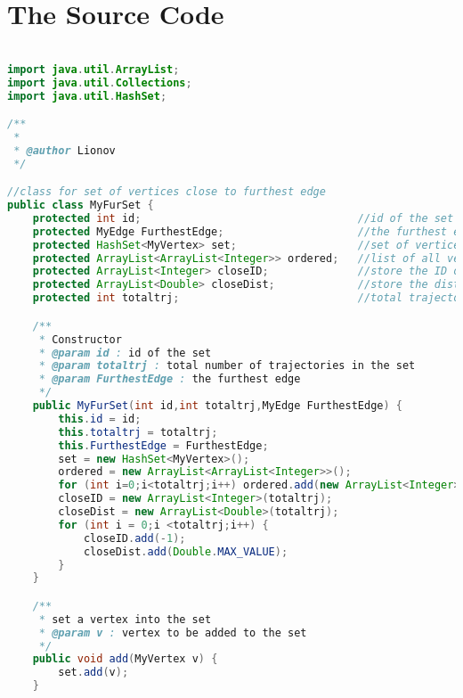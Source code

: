 \chapter{The Source Code}
\label{app:B}

\singlespacing 
%
%
\begin{lstlisting}[language=Java,basicstyle=\tiny,caption=MyFurSet.java]

import java.util.ArrayList;
import java.util.Collections;
import java.util.HashSet;

/**
 *
 * @author Lionov
 */

//class for set of vertices close to furthest edge
public class MyFurSet {
    protected int id;                                  //id of the set
    protected MyEdge FurthestEdge;                     //the furthest edge
    protected HashSet<MyVertex> set;                   //set of vertices close to furthest edge
    protected ArrayList<ArrayList<Integer>> ordered;   //list of all vertices in the set for each trajectory
    protected ArrayList<Integer> closeID;              //store the ID of all vertices
    protected ArrayList<Double> closeDist;             //store the distance of all vertices
    protected int totaltrj;                            //total trajectories in the set

    /**
     * Constructor
     * @param id : id of the set
     * @param totaltrj : total number of trajectories in the set
     * @param FurthestEdge : the furthest edge
     */
    public MyFurSet(int id,int totaltrj,MyEdge FurthestEdge) {
        this.id = id;
        this.totaltrj = totaltrj;
        this.FurthestEdge = FurthestEdge;
        set = new HashSet<MyVertex>();
        ordered = new ArrayList<ArrayList<Integer>>();
        for (int i=0;i<totaltrj;i++) ordered.add(new ArrayList<Integer>());
        closeID = new ArrayList<Integer>(totaltrj);
        closeDist = new ArrayList<Double>(totaltrj);
        for (int i = 0;i <totaltrj;i++) {
            closeID.add(-1);
            closeDist.add(Double.MAX_VALUE);
        }
    }

    /**
     * set a vertex into the set
     * @param v : vertex to be added to the set
     */
    public void add(MyVertex v) {
        set.add(v);
    }


\end{lstlisting}
